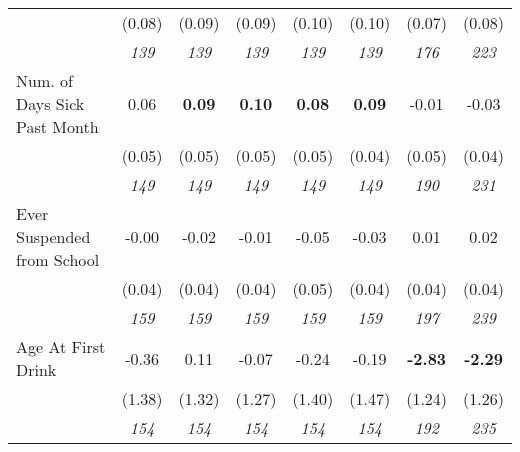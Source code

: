 \begin{tabular}{l c c c c c c c}
& (0.08) & (0.09) & (0.09) & (0.10) & (0.10) & (0.07) & (0.08) \\
& \textit{ 139 } & \textit{ 139 } & \textit{ 139 } & \textit{ 139 } & \textit{ 139 } & \textit{ 176 } & \textit{ 223 } \\
Num. of Days Sick Past Month & 0.06 & \textbf{ 0.09 } & \textbf{ 0.10 } & \textbf{0.08} & \textbf{0.09} & -0.01 & -0.03 \\
& (0.05) & (0.05) & (0.05) & (0.05) & (0.04) & (0.05) & (0.04) \\
& \textit{ 149 } & \textit{ 149 } & \textit{ 149 } & \textit{ 149 } & \textit{ 149 } & \textit{ 190 } & \textit{ 231 } \\
Ever Suspended from School & -0.00 & -0.02 & -0.01 & -0.05 & -0.03 & 0.01 & 0.02 \\
& (0.04) & (0.04) & (0.04) & (0.05) & (0.04) & (0.04) & (0.04) \\
& \textit{ 159 } & \textit{ 159 } & \textit{ 159 } & \textit{ 159 } & \textit{ 159 } & \textit{ 197 } & \textit{ 239 } \\
Age At First Drink & -0.36 & 0.11 & -0.07 & -0.24 & -0.19 & \textbf{-2.83} & \textbf{-2.29} \\
& (1.38) & (1.32) & (1.27) & (1.40) & (1.47) & (1.24) & (1.26) \\
& \textit{ 154 } & \textit{ 154 } & \textit{ 154 } & \textit{ 154 } & \textit{ 154 } & \textit{ 192 } & \textit{ 235 } \\
\bottomrule
\end{tabular}
